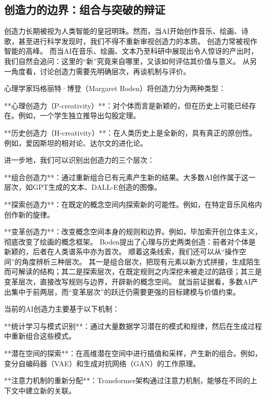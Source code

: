 \subsection{创造力的边界：组合与突破的辩证}

创造力长期被视为人类智能的皇冠明珠。然而，当AI开始创作音乐、绘画、诗歌，甚至进行科学发现时，我们不得不重新审视创造力的本质。
创造力常被视作智能的高峰。
而当AI在音乐、绘画、文本乃至科研中展现出令人惊讶的产出时，我们自然会追问：这里的“新”究竟来自哪里，又该如何评估其价值与意义。
从另一角度看，讨论创造力需要先明确层次，再谈机制与评价。

心理学家玛格丽特·博登（Margaret Boden）将创造力分为两种类型：

**心理创造力（P-creativity）**：对个体而言是新颖的，但在历史上可能已经存在。例如，一个学生独立推导出勾股定理。

**历史创造力（H-creativity）**：在人类历史上是全新的，具有真正的原创性。例如，爱因斯坦的相对论、达尔文的进化论。

进一步地，我们可以识别出创造力的三个层次：

**组合创造力**：通过重新组合已有元素产生新的结果。大多数AI创作属于这一层次，如GPT生成的文本、DALL-E创造的图像。

**探索创造力**：在既定的概念空间内探索新的可能性。例如，在特定音乐风格内创作新的旋律。

**变革创造力**：改变概念空间本身的规则和边界。例如，毕加索开创立体主义，彻底改变了绘画的概念框架。
Boden提出了心理与历史两类创造：前者对个体是新颖的，后者在人类谱系中亦为首次。
顺着这条线索，我们还可以从“操作空间”的角度辨析三种层次。
其一是组合层次，把现有元素以新方式拼接，生成陌生而可解读的结构；其二是探索层次，在既定规则之内深挖未被走过的路径；其三是变革层次，直接改写规则与边界，开辟新的概念空间。
就当前证据看，多数AI产出集中于前两层，而“变革层次”的跃迁仍需要更强的目标建模与价值约束。

当前的AI创造力主要基于以下机制：

**统计学习与模式识别**：通过大量数据学习潜在的模式和规律，然后在生成过程中重新组合这些模式。

**潜在空间的探索**：在高维潜在空间中进行插值和采样，产生新的组合。例如，变分自编码器（VAE）和生成对抗网络（GAN）的工作原理。

**注意力机制的重新分配**：Transformer架构通过注意力机制，能够在不同的上下文中建立新的关联。

